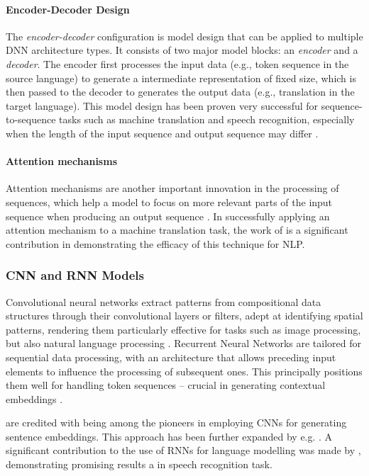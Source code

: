 \documentclass[11pt, numbers=noenddot]{scrreprt}
\let\citef\cite  %
\let\cite\parencite  %
\begin{document}
\paragraph{Encoder-Decoder Design}
The \textit{encoder-decoder} configuration is model design that can be applied to multiple DNN architecture types. It consists of two major model blocks: an \textit{encoder} and a \textit{decoder}. The encoder first processes the input data (e.g., token sequence in the source language) to generate a  intermediate representation of fixed size, which is then passed to the decoder to generates the output data (e.g., translation in the target language). This model design has been proven very successful for sequence-to-sequence tasks such as machine translation and speech recognition, especially when the length of the input sequence and output sequence may differ \cite{choPropertiesNeuralMachine2014}.

\paragraph{Attention mechanisms}
Attention mechanisms are another important innovation in the processing of sequences, which help a model to focus on more relevant parts of the input sequence when producing an output sequence \cite{galassiAttentionNaturalLanguage2021}. In successfully applying an attention mechanism to a machine translation task, the work of \citef{bahdanauNeuralMachineTranslation2016} is a significant contribution in demonstrating the efficacy of this technique for NLP.


\subsubsection{CNN and RNN Models}
Convolutional neural networks extract patterns from compositional data structures through their convolutional layers or filters, adept at identifying spatial patterns, rendering them particularly effective for tasks such as image processing, but also natural language processing \cite{albawiUnderstandingConvolutionalNeural2017}. Recurrent Neural Networks are tailored for sequential data processing, with an architecture that allows preceding input elements to influence the processing of subsequent ones. This principally positions them well for handling token sequences -- crucial in generating contextual embeddings \cite{yuReviewRecurrentNeural2019}.

\citef{collobertUnifiedArchitectureNatural2008} are credited with being among the pioneers in employing CNNs for generating sentence embeddings. This approach has been further expanded by e.g.  \citef{kalchbrennerConvolutionalNeuralNetwork2014}. A significant contribution to the use of RNNs for language modelling was made by \citef{mikolovRecurrentNeuralNetwork2010}, demonstrating promising results a in speech recognition task.
\end{document}
